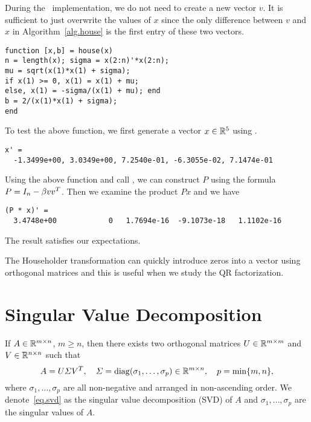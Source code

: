 During the \mat~implementation, we do not need to create a new vector $v$. It is sufficient to just overwrite the values of $x$ since the only difference between $v$ and $x$ in Algorithm~\ref{alg.house} is the first entry of these two vectors.

\begin{lstlisting}
function [x,b] = house(x)
n = length(x); sigma = x(2:n)'*x(2:n); 
mu = sqrt(x(1)*x(1) + sigma);
if x(1) >= 0, x(1) = x(1) + mu;
else, x(1) = -sigma/(x(1) + mu); end
b = 2/(x(1)*x(1) + sigma); 
end
\end{lstlisting}

To test the above function, we first generate a vector $x\in\mathbb{R}^5$ using . 
\begin{lstlisting}
x' = 
  -1.3499e+00, 3.0349e+00, 7.2540e-01, -6.3055e-02, 7.1474e-01
\end{lstlisting}
Using the above function and call , we can construct $P$ using the formula $P = I_n - \beta vv^T$. Then we examine the product $Px$ and we have 
\begin{lstlisting}
(P * x)' = 
  3.4748e+00            0   1.7694e-16  -9.1073e-18   1.1102e-16
\end{lstlisting}
The result satisfies our expectations. 

The Householder transformation can quickly introduce zeros into a vector using orthogonal matrices and this is useful when we study the QR factorization.

\section{Singular Value Decomposition}\label{sec:svd}

\begin{theorem}
    \label{thm.svd}
    If $A\in\mathbb{R}^{m\times n}$, $m\geq n$, then there exists two orthogonal matrices $U\in\mathbb{R}^{m\times m}$ and $V\in\mathbb{R}^{n\times n}$ such that 
    \begin{equation}\label{eq.svd}
        A = U\varSigma V^T,\quad \varSigma = \mathrm{diag}(\sigma_1,\dots,\sigma_p)\in\mathbb{R}^{m\times n},\quad p = \min\{m,n\},
    \end{equation}
    where $\sigma_1,\dots,\sigma_p$ are all non-negative and arranged in non-ascending order. We denote~\eqref{eq.svd} as the singular value decomposition (SVD) of $A$ and $\sigma_1,\dots,\sigma_p$ are the singular values of $A$.
\end{theorem}

